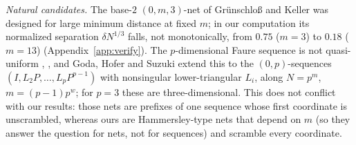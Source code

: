 \documentclass[11pt]{amsart}
\theoremstyle{definition}
\theoremstyle{plain}
\begin{document}
\emph{Natural candidates.} The base-$2$ $(0,m,3)$-net of Gr\"unschlo{\ss} and Keller \cite[Sec.~2]{GK09} was designed for large minimum distance at fixed $m$; in our computation its normalized separation $\delta N^{1/3}$ falls, not monotonically, from $0.75$ ($m=3$) to $0.18$ ($m=13$) (Appendix~\ref{app:verify}). The $p$-dimensional Faure sequence is not quasi-uniform \cite[Thm.~4.3, Cor.~4.4]{DGS2}, \cite[Thm.~2(3)]{GHS26}, and Goda, Hofer and Suzuki \cite[Remark~3]{GHS26} extend this to the $(0,p)$-sequences $(I,L_2P,\dots,L_pP^{p-1})$ with nonsingular lower-triangular $L_i$, along $N=p^m$, $m=(p-1)p^w$; for $p=3$ these are three-dimensional. This does not conflict with our results: those nets are prefixes of one sequence whose first coordinate is unscrambled, whereas ours are Hammersley-type nets that depend on $m$ (so they answer the question for nets, not for sequences) and scramble every coordinate.
\end{document}
